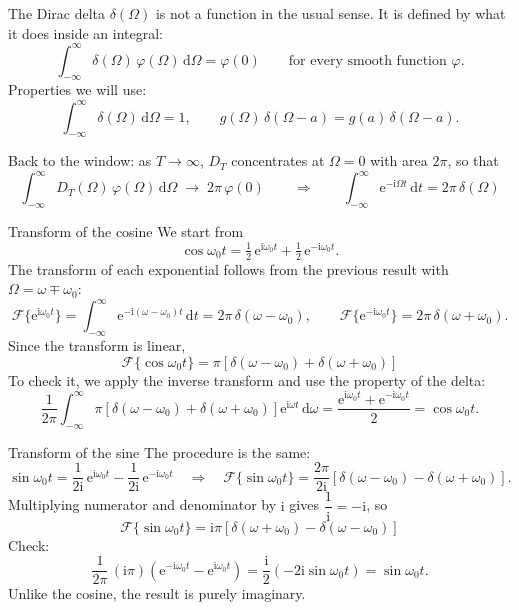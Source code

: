 \documentclass[11pt,aspectratio=169]{beamer}
\newcommand{\F}{\mathcal{F}}
\newcommand{\dd}{\,\mathrm{d}}
\newcommand{\ii}{\mathrm{i}}
\newcommand{\e}{\mathrm{e}}
\begin{document}
\begin{frame}{The Dirac delta}
  $\delta(\Omega)$ is not a function in the usual sense. It is defined by what it does inside
  an integral:
  \[
    \int_{-\infty}^{\infty}\delta(\Omega)\,\varphi(\Omega)\dd\Omega=\varphi(0)
    \qquad\text{for every smooth function }\varphi .
  \]
  Properties we will use:
  \[
    \int_{-\infty}^{\infty}\delta(\Omega)\dd\Omega=1,
    \qquad
    g(\Omega)\,\delta(\Omega-a)=g(a)\,\delta(\Omega-a).
  \]

  \vspace{2mm}
  Back to the window: as $T\to\infty$, $D_T$ concentrates at $\Omega=0$ with area
  $2\pi$, so that
  \[
    \int_{-\infty}^{\infty}D_T(\Omega)\,\varphi(\Omega)\dd\Omega\;\longrightarrow\;2\pi\,\varphi(0)
    \qquad\Longrightarrow\qquad
    \boxed{\int_{-\infty}^{\infty}\e^{-\ii\Omega t}\dd t=2\pi\,\delta(\Omega)}
  \]
\end{frame}

\begin{frame}{Transform of the cosine}
  We start from
  \[
    \cos\omega_0 t=\tfrac12\,\e^{\ii\omega_0 t}+\tfrac12\,\e^{-\ii\omega_0 t}.
  \]
  The transform of each exponential follows from the previous result with $\Omega=\omega\mp\omega_0$:
  \[
    \F\{\e^{\ii\omega_0 t}\}=\int_{-\infty}^{\infty}\e^{-\ii(\omega-\omega_0)t}\dd t=2\pi\,\delta(\omega-\omega_0),
    \qquad
    \F\{\e^{-\ii\omega_0 t}\}=2\pi\,\delta(\omega+\omega_0).
  \]
  Since the transform is linear,
  \[
    \boxed{\F\{\cos\omega_0 t\}=\pi\left[\delta(\omega-\omega_0)+\delta(\omega+\omega_0)\right]}
  \]
  To check it, we apply the inverse transform and use the property of the delta:
  \[
    \frac{1}{2\pi}\int_{-\infty}^{\infty}\pi\left[\delta(\omega-\omega_0)+\delta(\omega+\omega_0)\right]\e^{\ii\omega t}\dd\omega
    =\frac{\e^{\ii\omega_0 t}+\e^{-\ii\omega_0 t}}{2}=\cos\omega_0 t .
  \]
\end{frame}

\begin{frame}{Transform of the sine}
  The procedure is the same:
  \[
    \sin\omega_0 t=\frac{1}{2\ii}\,\e^{\ii\omega_0 t}-\frac{1}{2\ii}\,\e^{-\ii\omega_0 t}
    \quad\Longrightarrow\quad
    \F\{\sin\omega_0 t\}=\frac{2\pi}{2\ii}\left[\delta(\omega-\omega_0)-\delta(\omega+\omega_0)\right].
  \]
  Multiplying numerator and denominator by $\ii$ gives $\dfrac{1}{\ii}=-\ii$, so
  \[
    \boxed{\F\{\sin\omega_0 t\}=\ii\pi\left[\delta(\omega+\omega_0)-\delta(\omega-\omega_0)\right]}
  \]
  Check:
  \[
    \frac{1}{2\pi}\,(\ii\pi)\left(\e^{-\ii\omega_0 t}-\e^{\ii\omega_0 t}\right)
    =\frac{\ii}{2}\left(-2\ii\sin\omega_0 t\right)=\sin\omega_0 t .
  \]
  Unlike the cosine, the result is purely imaginary.
\end{frame}
\end{document}
